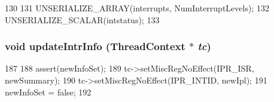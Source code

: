 \begin{DoxyCode}
130     {
131         UNSERIALIZE_ARRAY(interrupts, NumInterruptLevels);
132         UNSERIALIZE_SCALAR(intstatus);
133     }
\end{DoxyCode}
\hypertarget{classAlphaISA_1_1Interrupts_a00892e9b06edcba6c3c27454d6235100}{
\subsubsection[{updateIntrInfo}]{\setlength{\rightskip}{0pt plus 5cm}void updateIntrInfo ({\bf ThreadContext} $\ast$ {\em tc})}}
\label{classAlphaISA_1_1Interrupts_a00892e9b06edcba6c3c27454d6235100}



\begin{DoxyCode}
187     {
188         assert(newInfoSet);
189         tc->setMiscRegNoEffect(IPR_ISR, newSummary);
190         tc->setMiscRegNoEffect(IPR_INTID, newIpl);
191         newInfoSet = false;
192     }
\end{DoxyCode}


